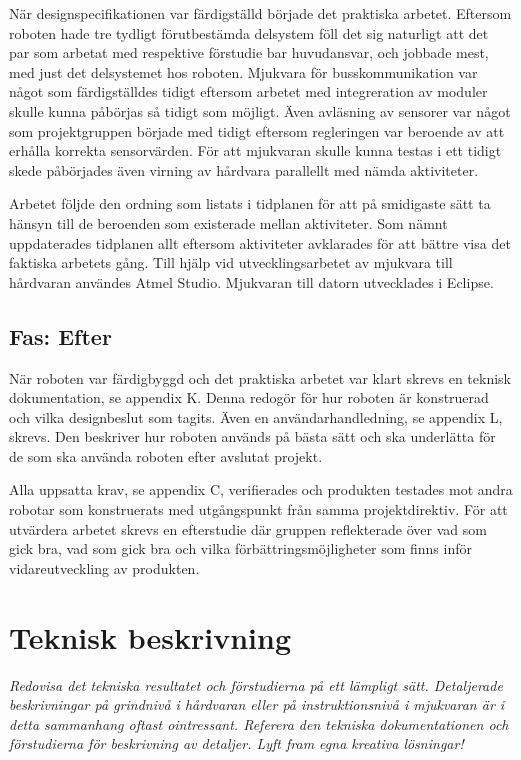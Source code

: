 \documentclass[11pt]{article}
\begin{document}
\begin{flushleft}
När designspecifikationen var färdigställd började det praktiska arbetet. Eftersom roboten hade tre tydligt förutbestämda delsystem föll det sig naturligt att det par som arbetat med respektive förstudie bar huvudansvar, och jobbade mest, med just det delsystemet hos roboten. Mjukvara för busskommunikation var något som färdigställdes tidigt eftersom arbetet med integreration av moduler skulle kunna påbörjas så tidigt som möjligt. Även avläsning av sensorer var något som projektgruppen började med tidigt eftersom regleringen var beroende av att erhålla korrekta sensorvärden. För att mjukvaran skulle kunna testas i ett tidigt skede påbörjades även virning av hårdvara parallellt med nämda aktiviteter. 

Arbetet följde den ordning som listats i tidplanen för att på smidigaste sätt ta hänsyn till de beroenden som existerade mellan aktiviteter. Som nämnt uppdaterades tidplanen allt eftersom aktiviteter avklarades för att bättre visa det faktiska arbetets gång. Till hjälp vid utvecklingsarbetet av mjukvara till hårdvaran användes Atmel Studio. Mjukvaran till datorn utvecklades i Eclipse. 

\subsection{Fas: Efter}
När roboten var färdigbyggd och det praktiska arbetet var klart skrevs en teknisk dokumentation, se appendix K. Denna redogör för hur roboten är konstruerad och vilka designbeslut som tagits. Även en användarhandledning, se appendix L, skrevs. Den beskriver hur roboten används på bästa sätt och ska underlätta för de som ska använda roboten efter avslutat projekt.

Alla uppsatta krav, se appendix C, verifierades och produkten testades mot andra robotar som konstruerats med utgångspunkt från samma projektdirektiv. För att utvärdera arbetet skrevs en efterstudie där gruppen reflekterade över vad som gick bra, vad som gick bra och vilka förbättringsmöjligheter som finns inför vidareutveckling av produkten.

\pagebreak

\section{Teknisk beskrivning}
\textit{Redovisa det tekniska resultatet och förstudierna på ett lämpligt sätt. Detaljerade beskrivningar på grindnivå i hårdvaran eller på instruktionsnivå i mjukvaran är i detta sammanhang oftast ointressant. Referera den tekniska dokumentationen och förstudierna för beskrivning av detaljer. Lyft fram egna kreativa lösningar!}


\end{flushleft}
\end{document}
